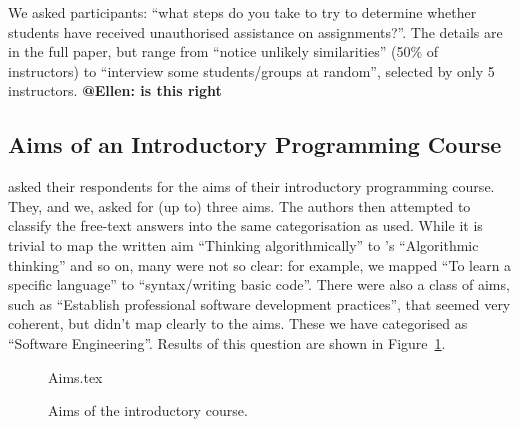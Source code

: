 \documentclass{sig-alternate}
\begin{document}
We  asked participants: ``what steps do you take to try to determine whether students have received unauthorised assistance on assignments?''. The details are in the full paper, but range from ``notice unlikely similarities'' (50\% of instructors) to ``interview some students/groups at random'', selected by only 5 instructors. {\bf @Ellen: is this right}

\iffalse
We
report our results in Figure \ref{fig:Plagiarise}, as we think they
are of general interest. 

\fi
\subsection{Aims of an Introductory Programming Course}

 \cite{mason+cooper:2014} asked their respondents for the aims of
their introductory programming course. They, and we, asked for (up to)
three aims. The authors then attempted to classify the free-text
answers into the same categorisation as \cite{mason+cooper:2014}
used. While it is trivial to map the written aim ``Thinking
algorithmically'' to \cite{mason+cooper:2014}'s ``Algorithmic
thinking'' and so on, many were not so clear: for example, we mapped
``To learn a specific language'' to ``syntax/writing basic
code''. There were also a class of aims, such as ``Establish
professional software development practices'', that seemed very
coherent, but didn't map clearly to the \cite{mason+cooper:2014}
aims. These we have categorised as ``Software Engineering''. Results of this question are shown in Figure~\ref{fig:aims}.

\begin{figure}
\begin{center}
{Aims.tex}
\end{center}\vskip-18pt
\caption{Aims of the introductory course. \label{fig:aims}}
\end{figure}
\end{document}
